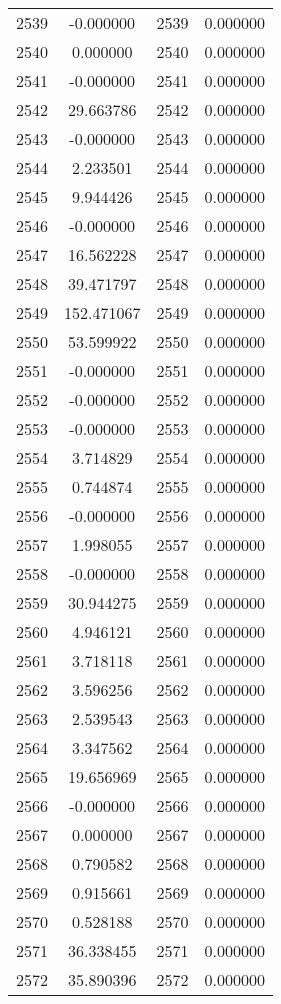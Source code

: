 \documentclass[12pt]{article}
\begin{document}
\begin{longtable}{@{}cccc@{}}
2539 & -0.000000 & 2539 & 0.000000 \\
2540 & 0.000000 & 2540 & 0.000000 \\
2541 & -0.000000 & 2541 & 0.000000 \\
2542 & 29.663786 & 2542 & 0.000000 \\
2543 & -0.000000 & 2543 & 0.000000 \\
2544 & 2.233501 & 2544 & 0.000000 \\
2545 & 9.944426 & 2545 & 0.000000 \\
2546 & -0.000000 & 2546 & 0.000000 \\
2547 & 16.562228 & 2547 & 0.000000 \\
2548 & 39.471797 & 2548 & 0.000000 \\
2549 & 152.471067 & 2549 & 0.000000 \\
2550 & 53.599922 & 2550 & 0.000000 \\
2551 & -0.000000 & 2551 & 0.000000 \\
2552 & -0.000000 & 2552 & 0.000000 \\
2553 & -0.000000 & 2553 & 0.000000 \\
2554 & 3.714829 & 2554 & 0.000000 \\
2555 & 0.744874 & 2555 & 0.000000 \\
2556 & -0.000000 & 2556 & 0.000000 \\
2557 & 1.998055 & 2557 & 0.000000 \\
2558 & -0.000000 & 2558 & 0.000000 \\
2559 & 30.944275 & 2559 & 0.000000 \\
2560 & 4.946121 & 2560 & 0.000000 \\
2561 & 3.718118 & 2561 & 0.000000 \\
2562 & 3.596256 & 2562 & 0.000000 \\
2563 & 2.539543 & 2563 & 0.000000 \\
2564 & 3.347562 & 2564 & 0.000000 \\
2565 & 19.656969 & 2565 & 0.000000 \\
2566 & -0.000000 & 2566 & 0.000000 \\
2567 & 0.000000 & 2567 & 0.000000 \\
2568 & 0.790582 & 2568 & 0.000000 \\
2569 & 0.915661 & 2569 & 0.000000 \\
2570 & 0.528188 & 2570 & 0.000000 \\
2571 & 36.338455 & 2571 & 0.000000 \\
2572 & 35.890396 & 2572 & 0.000000 \\

\end{longtable}
\end{document}
